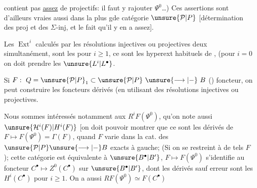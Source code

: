 contient pas \uline{assez} de \inserted{$\Sigma$-}projectifs: il faut y rajouter $\Psi^0$\ldots)  Ces assertions sont d'ailleurs vraies aussi dans la plus gde catégorie $\unsure{\mathcal P|P}$ [détermination des \inserted{$\Sigma$-}proj et des $\Sigma$-inj, et le fait qu'il y en a assez].

Les $\operatorname{Ext}^i$ calculés par les résolutions injectives  ou projectives    deux simultanément, sont les  pour $i\geq1$, ce sont les hyperext habituels de , (pour $i=0$ on doit prendre les $\unsure{L^i|L^\bullet}$.

Si $F:\ Q=\unsure{\mathcal P|P}_1\subset \unsure{\mathcal P|P}\ \unsure{\longrightarrow|{-}}\ B$ ()  foncteur, on peut construire les foncteurs dérivés  (en utilisant des résolutions injectives ou projectives.

Nous sommes intéressés notamment aux $R^iF(\Psi^0)$, qu'on note aussi $\unsure{\mathcal H^i(F)|H^i(F)}$ [on doit pouvoir montrer que ce sont les dérivés  de $F\mapsto F(\Psi^0)=\Gamma(F)$, quand $F$ varie dans la cat. des   $\unsure{\mathcal P|P}\unsure{\longrightarrow|{-}}B$ \inserted{$\Sigma$-}exacts à gauche; (Si on se restreint à de tels $F$);  cette catégorie est équivalente à   $\unsure{B^\bullet|B'}$, $F\mapsto F(\Psi^0)$ s'identifie  au foncteur $C^\bullet\mapsto Z^0(C^\bullet)$ sur $\unsure{B^\bullet|B'}$, dont les dérivés sauf erreur sont les $H^i(C^\bullet)$ pour $i\geq1$. On a aussi $RF(\Psi^0)\simeq F(C^\bullet)$

